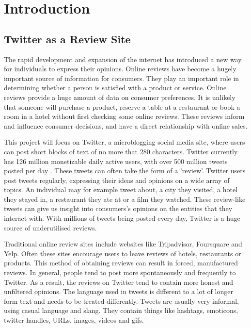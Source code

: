 \chapter{Introduction}

\section{Twitter as a Review Site}
The rapid development and expansion of the internet has introduced a new way for individuals to express their opinions. Online reviews have become a hugely important source of information for consumers. They play an important role in determining whether a person is satisfied with a product or service. Online reviews provide a huge amount of data on consumer preferences. It is unlikely that someone will purchase a product, reserve a table at a restaurant or book a room in a hotel without first checking some online reviews. These reviews inform and influence consumer decisions, and have a direct relationship with online sales. 

This project will focus on Twitter, a microblogging social media site, where users can post short blocks of text of no more that 280 characters. Twitter currently has 126 million monetizable daily active users, with over 500 million tweets posted per day \cite{Twitter2019}. These tweets can often take the form of a 'review'. Twitter users post tweets regularly, expressing their ideas and opinions on a wide array of topics. An individual may for example tweet about, a city they visited, a hotel they stayed in, a restaurant they ate at or a film they watched. These review-like tweets can give us insight into consumers’s opinions on the entities that they interact with. With millions of tweets being posted every day, Twitter is a huge source of underutilised reviews.

Traditional online review sites include websites like Tripadvisor, Foursquare and Yelp. Often these sites encourage users to leave reviews of hotels, restaurants or products. This method of obtaining reviews can result in forced, manufactured reviews. In general, people tend to post more spontaneously and frequently to Twitter. As a result, the reviews on Twitter tend to contain more honest and unfiltered opinions. The language used in tweets is different to a lot of longer form text and needs to be treated differently. Tweets are usually very informal, using casual language and slang. They contain things like hashtags, emoticons, twitter handles, URLs, images, videos and gifs.

